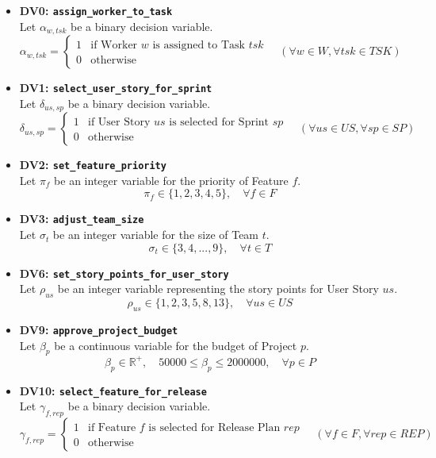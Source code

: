 \documentclass[11pt, a4paper]{article}
\begin{document}
\begin{itemize}
    \item \textbf{DV0: \texttt{assign\_worker\_to\_task}}
    \\ Let $\alpha_{w,tsk}$ be a binary decision variable.
    $$ \alpha_{w,tsk} = 
    \begin{cases} 
    1 & \text{if Worker } w \text{ is assigned to Task } tsk \\ 
    0 & \text{otherwise} 
    \end{cases} 
    \quad (\forall w \in W, \forall tsk \in TSK) $$
    
    \item \textbf{DV1: \texttt{select\_user\_story\_for\_sprint}}
    \\ Let $\delta_{us,sp}$ be a binary decision variable.
    $$ \delta_{us,sp} = 
    \begin{cases} 
    1 & \text{if User Story } us \text{ is selected for Sprint } sp \\ 
    0 & \text{otherwise} 
    \end{cases} 
    \quad (\forall us \in US, \forall sp \in SP) $$

    \item \textbf{DV2: \texttt{set\_feature\_priority}}
    \\ Let $\pi_f$ be an integer variable for the priority of Feature $f$.
    $$ \pi_f \in \{1, 2, 3, 4, 5\}, \quad \forall f \in F $$
    
    \item \textbf{DV3: \texttt{adjust\_team\_size}}
    \\ Let $\sigma_t$ be an integer variable for the size of Team $t$.
    $$ \sigma_t \in \{3, 4, ..., 9\}, \quad \forall t \in T $$
    
    \item \textbf{DV6: \texttt{set\_story\_points\_for\_user\_story}}
    \\ Let $\rho_{us}$ be an integer variable representing the story points for User Story $us$.
    $$ \rho_{us} \in \{1, 2, 3, 5, 8, 13\}, \quad \forall us \in US $$
    
    \item \textbf{DV9: \texttt{approve\_project\_budget}}
    \\ Let $\beta_p$ be a continuous variable for the budget of Project $p$.
    $$ \beta_p \in \mathbb{R}^+, \quad 50000 \le \beta_p \le 2000000, \quad \forall p \in P $$

    \item \textbf{DV10: \texttt{select\_feature\_for\_release}}
    \\ Let $\gamma_{f,rep}$ be a binary decision variable.
    $$ \gamma_{f,rep} = 
    \begin{cases} 
    1 & \text{if Feature } f \text{ is selected for Release Plan } rep \\ 
    0 & \text{otherwise} 
    \end{cases} 
    \quad (\forall f \in F, \forall rep \in REP) $$
\end{itemize}
\end{document}
